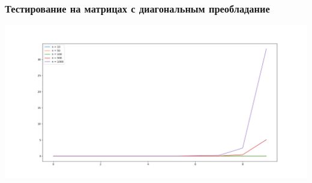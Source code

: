 \documentclass[english]{article}
\begin{document}
\subsubsection{Тестирование на матрицах с диагональным преобладание}
\begin{center}
    \includegraphics[scale=0.4]{main_elem.png}
\end{center}
\end{document}
